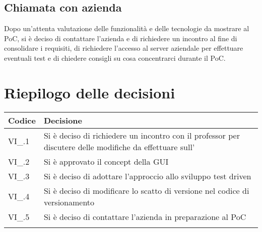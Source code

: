 \subsection{Chiamata con azienda}
Dopo un'attenta valutazione delle funzionalità e delle tecnologie da mostrare al PoC, si è deciso di contattare l'azienda e di richiedere un incontro al fine di consolidare i requisiti, di richiedere l'accesso al server aziendale per effettuare eventuali test e di chiedere consigli su cosa concentrarci durante il PoC.

\newpage

\section{Riepilogo delle decisioni \hfil}
{
	\setlength{\freewidth}{\dimexpr\textwidth-4\tabcolsep}
	\renewcommand{\arraystretch}{1.5}
	\setlength{\aboverulesep}{0pt}
	\setlength{\belowrulesep}{0pt}
	\begin{longtable}{L{.3\freewidth} L{.7\freewidth}}
		\toprule
		\textbf{Codice} & \textbf{Decisione}\\
		\toprule
		\endhead
		
		VI\_\DataMeeting{}.1 & Si è deciso di richiedere un incontro con il professor \Riccardo{} per discutere delle modifiche da effettuare sull'\AdR{}\\
		VI\_\DataMeeting{}.2 & Si è approvato il concept della GUI\\
		VI\_\DataMeeting{}.3 & Si è deciso di adottare l'approccio allo sviluppo test driven\\
		VI\_\DataMeeting{}.4 & Si è deciso di modificare lo scatto di versione nel codice di versionamento\\
		VI\_\DataMeeting{}.5 & Si è deciso di contattare l'azienda in preparazione al PoC\\
		
		\bottomrule
		\hiderowcolors
	\end{longtable}
}